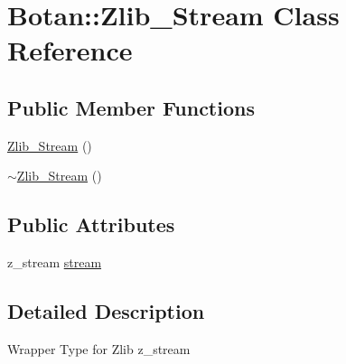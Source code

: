\hypertarget{classBotan_1_1Zlib__Stream}{\section{Botan\-:\-:Zlib\-\_\-\-Stream Class Reference}
\label{classBotan_1_1Zlib__Stream}
}
\subsection*{Public Member Functions}
\begin{DoxyCompactItemize}
\item 
\hyperlink{classBotan_1_1Zlib__Stream_a1966eca94f393e7086e7227fb79eb296}{Zlib\-\_\-\-Stream} ()
\item 
\hyperlink{classBotan_1_1Zlib__Stream_ac2d286a2060fe611fd569252897d55f7}{$\sim$\-Zlib\-\_\-\-Stream} ()
\end{DoxyCompactItemize}
\subsection*{Public Attributes}
\begin{DoxyCompactItemize}
\item 
z\-\_\-stream \hyperlink{classBotan_1_1Zlib__Stream_a4a21895d4d7a9710e712fcb1c132baf1}{stream}
\end{DoxyCompactItemize}


\subsection{Detailed Description}
Wrapper Type for Zlib z\-\_\-stream 

